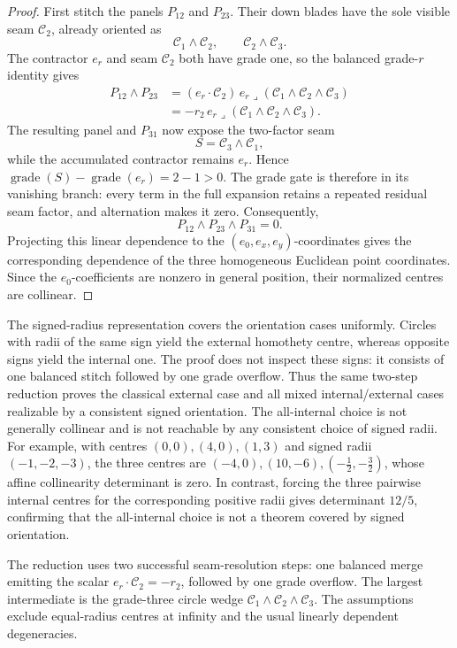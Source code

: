 \documentclass[11pt]{article}
\begin{document}
\begin{proof}
First stitch the panels \(P_{12}\) and \(P_{23}\). Their down blades have the
sole visible seam \(\mathcal C_2\), already oriented as
\[
\mathcal C_1\wedge\mathcal C_2,\qquad
\mathcal C_2\wedge\mathcal C_3.
\]
The contractor \(e_r\) and seam \(\mathcal C_2\) both have grade one, so the
balanced grade-\(r\) identity gives
\[
\begin{aligned}
P_{12}\wedge P_{23}
 &= (e_r\cdot\mathcal C_2)\,
    e_r\mathbin{\lrcorner}
    (\mathcal C_1\wedge\mathcal C_2\wedge\mathcal C_3)\\
 &=-r_2\,
    e_r\mathbin{\lrcorner}
    (\mathcal C_1\wedge\mathcal C_2\wedge\mathcal C_3).
\end{aligned}
\]
The resulting panel and \(P_{31}\) now expose the two-factor seam
\[
 S=\mathcal C_3\wedge\mathcal C_1,
\]
while the accumulated contractor remains \(e_r\). Hence
\(\operatorname{grade}(S)-\operatorname{grade}(e_r)=2-1>0\).
The grade gate is therefore in its vanishing branch: every term in the full
expansion retains a repeated residual seam factor, and alternation makes it
zero. Consequently,
\[
 P_{12}\wedge P_{23}\wedge P_{31}=0.
\]
Projecting this linear dependence to the \((e_0,e_x,e_y)\)-coordinates gives
the corresponding dependence of the three homogeneous Euclidean point
coordinates. Since the \(e_0\)-coefficients are nonzero in general position,
their normalized centres are collinear.
\end{proof}

The signed-radius representation covers the orientation cases uniformly.
Circles with radii of the same sign yield the external homothety centre,
whereas opposite signs yield the internal one. The proof does not inspect
these signs: it consists of one balanced stitch followed by one grade
overflow. Thus the same two-step reduction proves the classical external
case and all mixed internal/external cases realizable by a consistent signed
orientation. The all-internal choice is not generally collinear and is not
reachable by any consistent choice of signed radii.
For example, with centres \((0,0),(4,0),(1,3)\) and signed radii
\((-1,-2,-3)\), the three centres are
\((-4,0),(10,-6),(-\tfrac12,-\tfrac32)\), whose affine collinearity
determinant is zero. In contrast, forcing the three pairwise internal centres
for the corresponding positive radii gives determinant \(12/5\), confirming
that the all-internal choice is not a theorem covered by signed orientation.

The reduction uses two successful seam-resolution steps: one balanced merge
emitting the scalar \(e_r\cdot\mathcal C_2=-r_2\), followed by one grade
overflow. The largest intermediate is the grade-three circle wedge
\(\mathcal C_1\wedge\mathcal C_2\wedge\mathcal C_3\). The assumptions exclude
equal-radius centres at infinity and the usual linearly dependent
degeneracies.
\end{document}
